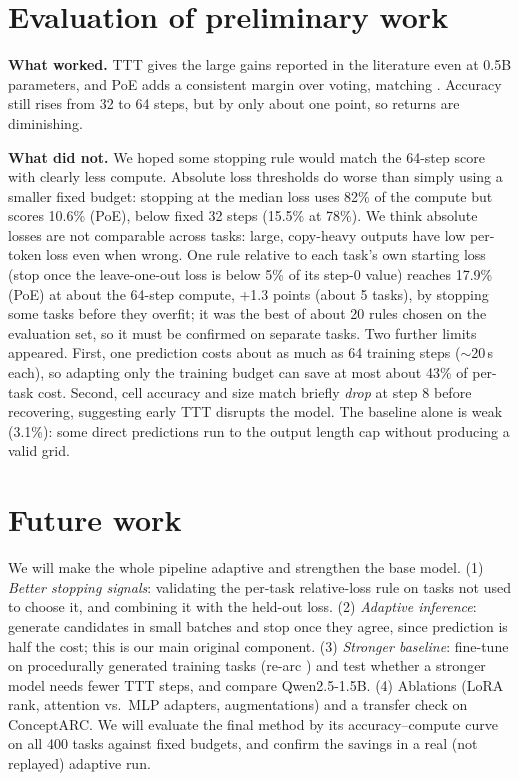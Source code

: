 \documentclass{article}
\begin{document}
\section{Evaluation of preliminary work}

\textbf{What worked.} TTT gives the large gains reported in the literature even at 0.5B parameters, and PoE adds a consistent margin over voting, matching \textcite{franzen2025product}. Accuracy still rises from 32 to 64 steps, but by only about one point, so returns are diminishing.

\textbf{What did not.} We hoped some stopping rule would match the 64-step score with clearly less compute. Absolute loss thresholds do worse than simply using a smaller fixed budget: stopping at the median loss uses 82\% of the compute but scores 10.6\% (PoE), below fixed 32 steps (15.5\% at 78\%). We think absolute losses are not comparable across tasks: large, copy-heavy outputs have low per-token loss even when wrong. One rule relative to each task's own starting loss (stop once the leave-one-out loss is below 5\% of its step-0 value) reaches 17.9\% (PoE) at about the 64-step compute, +1.3 points (about 5 tasks), by stopping some tasks before they overfit; it was the best of about 20 rules chosen on the evaluation set, so it must be confirmed on separate tasks. Two further limits appeared. First, one prediction costs about as much as 64 training steps ($\sim$20\,s each), so adapting only the training budget can save at most about 43\% of per-task cost. Second, cell accuracy and size match briefly \emph{drop} at step 8 before recovering, suggesting early TTT disrupts the model. The baseline alone is weak (3.1\%): some direct predictions run to the output length cap without producing a valid grid.

\section{Future work}

We will make the whole pipeline adaptive and strengthen the base model. (1) \emph{Better stopping signals}: validating the per-task relative-loss rule on tasks not used to choose it, and combining it with the held-out loss. (2) \emph{Adaptive inference}: generate candidates in small batches and stop once they agree, since prediction is half the cost; this is our main original component. (3) \emph{Stronger baseline}: fine-tune on procedurally generated training tasks (re-arc \cite{hodel2024rearc}) and test whether a stronger model needs fewer TTT steps, and compare Qwen2.5-1.5B. (4) Ablations (LoRA rank, attention vs.\ MLP adapters, augmentations) and a transfer check on ConceptARC. We will evaluate the final method by its accuracy--compute curve on all 400 tasks against fixed budgets, and confirm the savings in a real (not replayed) adaptive run.
\end{document}
